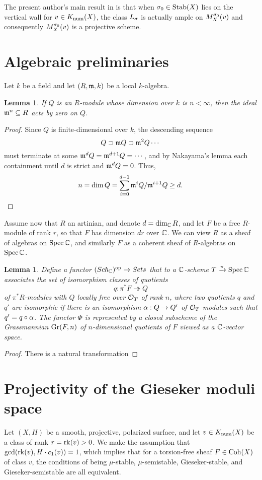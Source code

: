 \documentclass[letterpaper,12pt]{amsart}
\newtheorem{lem}[thm]{Lemma}
\theoremstyle{remark}
\begin{document}
The present author's main result in \cite{t} is that when $\sigma_0 \in \operatorname{\mathrm{Stab}}(X)$ lies on the vertical wall for $v \in K_{\mathrm{num}}(X)$, the class $L_\sigma$ is actually ample on $M^{\sigma_0}_X(v)$ and consequently $M^{\sigma_0}_X(v)$ is a projective scheme.

\section{Algebraic preliminaries}
Let $k$ be a field and let $(R,\mathfrak{m},k)$ be a local $k$-algebra. 
\begin{lem}\label{killedbymn}
    If $Q$ is an $R$-module whose dimension over $k$ is $n < \infty$, then the ideal $\mathfrak{m}^n \subseteq R$ acts by zero on $Q$. 
\end{lem}
\begin{proof}
Since $Q$ is finite-dimensional over $k$, the descending sequence
\[ Q \supset \mathfrak{m} Q \supset \mathfrak{m}^2 Q \cdots \]
must terminate at some $\mathfrak{m}^d Q = \mathfrak{m}^{d+1} Q = \cdots$, and by Nakayama's lemma each containment until $d$ is strict and $\mathfrak{m}^d Q = 0$. Thus,
\[ n = \dim Q = \sum_{i=0}^{d-1} \mathfrak{m}^i Q/\mathfrak{m}^{i+1} Q \ge d. \]
\end{proof}

Assume now that $R$ an artinian, and denote $d = \dim_{\mathbb{C}} R$, and let $F$ be a free $R$-module of rank $r$, so that $F$ has dimension $d r$ over $\mathbb{C}$. We can view $R$ as a sheaf of algebras on $\operatorname{\mathrm{Spec}} \mathbb{C}$, and similarly $F$ as a coherent sheaf of $R$-algebras on $\operatorname{\mathrm{Spec}} \mathbb{C}$.
\begin{lem}\label{subgrass}
    Define a functor $(Sch_{\mathbb{C}})^{\text{op}} \to Sets$ that to a $\mathbb{C}$-scheme $T \xrightarrow{\pi} \operatorname{\mathrm{Spec}} \mathbb{C}$ associates the set of isomorphism classes of quotients
    \[ q: \pi^*F \twoheadrightarrow Q \]
    of $\pi^*R$-modules with $Q$ locally free over $\mathcal{O}_T$ of rank $n$, where two quotients $q$ and $q'$ are isomorphic if there is an isomorphism $\alpha: Q \to Q'$ of $\mathcal{O}_T$-modules such that $q' = q \circ \alpha$. The functor $\Phi$ is represented by a closed subscheme of the Grassmannian $\mathrm{Gr}(F, n)$ of $n$-dimensional quotients of $F$ viewed as a $\mathbb{C}$-vector space.
\end{lem}
\begin{proof}
    There is a natural transformation 
\end{proof}

\section{Projectivity of the Gieseker moduli space}
Let $(X, H)$ be a smooth, projective, polarized surface, and let $v \in K_{\mathrm{num}}(X)$ be a class of rank $r = \operatorname{\mathrm{rk}}(v) > 0$. We make the assumption that $\gcd(\operatorname{\mathrm{rk}}(v), H\cdot c_1(v)) = 1$, which implies that for a torsion-free sheaf $F \in \mathrm{Coh}(X)$ of class $v$, the conditions of being $\mu$-stable, $\mu$-semistable, Gieseker-stable, and Gieseker-semistable are all equivalent.
\end{document}
